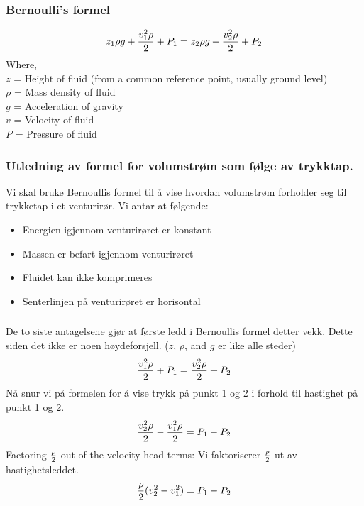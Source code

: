 \documentclass{beamer}
\begin{document}
%
\begin{frame}
	\frametitle{Bernoulli's formel}

	


%
$$z_1 \rho g + {v_1^2 \rho \over 2} + P_1 = z_2 \rho g + {v_2^2 \rho \over 2} + P_2$$
%
Where,\\
%
$z$ = Height of fluid (from a common reference point, usually ground level)\\
%
$\rho$ = Mass density of fluid\\
%
	$g$ = Acceleration of gravity\\
%
$v$ = Velocity of fluid\\
%
$P$ = Pressure of fluid\\
%
\end{frame}
%
\begin{frame}
	\frametitle{Utledning av formel for volumstrøm som følge av trykktap. }

	



%
%
Vi skal bruke Bernoullis formel til å vise hvordan volumstrøm forholder seg til trykketap i et venturirør. Vi antar at følgende:
\begin{itemize}
	\item Energien igjennom venturirøret er konstant
	\item Massen er befart igjennom venturirøret
	\item Fluidet kan ikke komprimeres
	\item Senterlinjen på venturirøret er horisontal
\end{itemize}
%
\end{frame}
\begin{frame}
	\frametitle{}

	


	De to siste antagelsene gjør at første ledd i Bernoullis formel detter vekk. Dette siden det ikke er noen høydeforsjell. ($z$, $\rho$, and $g$ er like alle steder)
%
$${v_1^2 \rho \over 2} + P_1 = {v_2^2 \rho \over 2} + P_2$$
%
Nå snur vi på formelen for å vise trykk på punkt 1 og 2 i forhold til hastighet på punkt 1 og 2. 
%
$${v_2^2 \rho \over 2} - {v_1^2 \rho \over 2} = P_1 - P_2$$
%
Factoring $\rho \over 2$ out of the velocity head terms:
Vi faktoriserer $\rho \over 2$ ut av hastighetsleddet. 
%
$${\rho \over 2} (v_2^2 - v_1^2) = P_1 - P_2$$
%
\end{frame}
\end{document}
